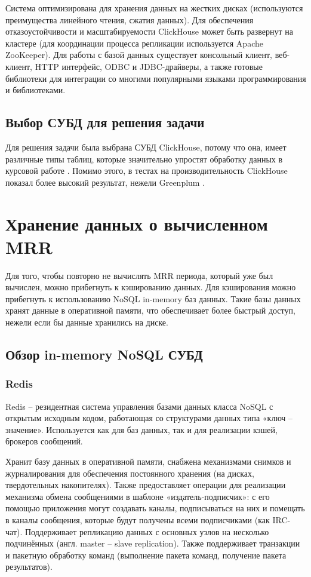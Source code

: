Система оптимизирована для хранения данных на жестких дисках (используются преимущества линейного чтения, сжатия данных). Для обеспечения отказоустойчивости и масштабируемости ClickHouse может быть развернут на кластере (для координации процесса репликации используется Apache ZooKeeper). Для работы с базой данных существует консольный клиент, веб-клиент, HTTP интерфейс, ODBC и JDBC-драйверы, а также готовые библиотеки для интеграции со многими популярными языками программирования и библиотеками.

\subsection{Выбор СУБД для решения задачи}

Для решения задачи была выбрана СУБД ClickHouse, потому что она, имеет различные типы таблиц, которые значительно упростят обработку данных в курсовой работе \cite{chengines}. Помимо этого, в тестах на производительность ClickHouse показал более высокий результат, нежели Greenplum \cite{chperf}.

\section{Хранение данных о вычисленном MRR}

Для того, чтобы повторно не вычислять MRR периода, который уже был вычислен, можно прибегнуть к кэшированию данных. Для кэширования можно прибегнуть к использованию NoSQL in-memory баз данных. Такие базы данных хранят данные в оперативной памяти, что обеспечивает более быстрый доступ, нежели если бы данные хранились на диске.

\subsection{Обзор in-memory NoSQL СУБД}

\subsubsection{Redis}

Redis \cite{redis} -- резидентная система управления базами данных класса NoSQL с открытым исходным кодом, работающая со структурами данных типа «ключ -- значение». Используется как для баз данных, так и для реализации кэшей, брокеров сообщений.

Хранит базу данных в оперативной памяти, снабжена механизмами снимков и журналирования для обеспечения постоянного хранения (на дисках, твердотельных накопителях). Также предоставляет операции для реализации механизма обмена сообщениями в шаблоне «издатель-подписчик»: с его помощью приложения могут создавать каналы, подписываться на них и помещать в каналы сообщения, которые будут получены всеми подписчиками (как IRC-чат). Поддерживает репликацию данных с основных узлов на несколько подчинённых (англ. master -- slave replication). Также поддерживает транзакции и пакетную обработку команд (выполнение пакета команд, получение пакета результатов).

